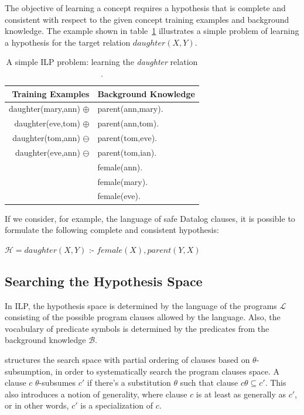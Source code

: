 The objective of learning a concept requires a hypothesis that is complete and consistent with respect to the given
concept training examples and background knowledge. The example shown in table~\ref{tab:ilpExample} illustrates a simple
problem of learning a hypothesis for the target relation
$daughter(X,Y)$.

\begin{table}[h!]
\caption{A simple ILP problem: learning the \emph{daughter} relation \citep{DBLP:journals/ml/LavracD96} .}
  \begin{center}
      \begin{tabular}{ r | l }
      \toprule
      \textbf{Training Examples} & \textbf{Background Knowledge}\\
      \midrule
      daughter(mary,ann) $\oplus$	& parent(ann,mary).	\\
      daughter(eve,tom) $\oplus$	& parent(ann,tom).	\\
      daughter(tom,ann) $\ominus$ 	& parent(tom,eve).	\\
      daughter(eve,ann) $\ominus$	& parent(tom,ian).	\\
					& female(ann).		\\
					& female(mary).		\\
					& female(eve).		\\
      \bottomrule
      \end{tabular}
  \label{tab:ilpExample}
  \end{center}
\end{table}

If we consider, for example, the language of safe Datalog clauses, it is possible to formulate the following complete
and consistent hypothesis:

\begin{center}
  $\mathcal{H} = daughter(X,Y)$ :- $female(X),parent(Y,X)$ 
\end{center}

\subsection{Searching the Hypothesis Space}

In ILP, the hypothesis space is determined by the language of the programs $\mathcal{L}$ consisting of the possible
program clauses allowed by the language. Also, the vocabulary of predicate symbols is determined by the predicates
from the background knowledge $\mathcal{B}$.

\citet{DBLP:journals/ml/LavracD96} structures the search space with partial ordering of clauses based on
$\theta$-subsumption, in order to systematically search the program clauses space. A clause $c$ $\theta$-subsumes $c'$
if there's a substitution $\theta$ such that clause $c\theta \subseteq c'$. This also introduces a notion of generality,
where clause $c$ is at least as generally as $c'$, or in other words, $c'$ is a specialization of $c$.

